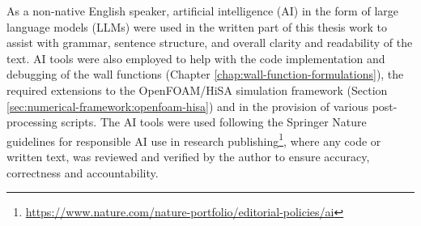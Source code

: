As a non-native English speaker, artificial intelligence (AI) in the form of large language models (LLMs) were used in the written part of this thesis work to assist with grammar, sentence structure, and overall clarity and readability of the text. AI tools were also employed to help with the code implementation and debugging of the wall functions (Chapter \ref{chap:wall-function-formulations}), the required extensions to the OpenFOAM/HiSA simulation framework (Section \ref{sec:numerical-framework:openfoam-hisa}) and in the provision of various post-processing scripts. The AI tools were used following the Springer Nature guidelines for responsible AI use in research publishing\footnote{\url{https://www.nature.com/nature-portfolio/editorial-policies/ai}}, where any code or written text, was reviewed and verified by the author to ensure accuracy, correctness and accountability.